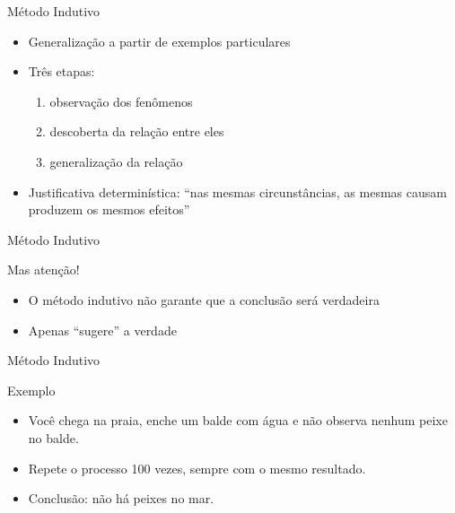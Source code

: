 \documentclass{beamer}
\begin{document}

\begin{frame}{Método Indutivo}
  \begin{itemize}
    \footnotesize
  \item \alert<1>{Generalização} a partir de exemplos particulares
    \bigskip
  \item Três etapas:
    \begin{enumerate}
      \scriptsize
    \item observação dos fenômenos
    \item descoberta da relação entre eles
    \item generalização da relação
    \end{enumerate}
    \bigskip
  \item Justificativa determinística: ``nas mesmas circunstâncias, as
    mesmas causam produzem os mesmos efeitos''
  \end{itemize}
\end{frame}


\begin{frame}{Método Indutivo}
  \begin{block}{Mas atenção!}
    \begin{itemize}
      \footnotesize
    \item O método indutivo não garante que a conclusão
      será verdadeira
      \bigskip
    \item Apenas ``sugere'' a verdade
    \end{itemize}
  \end{block}
\end{frame}

\begin{frame}{Método Indutivo}
  \begin{exampleblock}{Exemplo}
    \begin{itemize}
      \footnotesize
    \item Você chega na praia, enche um balde com água e não observa
      nenhum peixe no balde.
      \bigskip
    \item Repete o processo 100 vezes, sempre com o mesmo resultado.
      \bigskip
    \item Conclusão: não há peixes no mar.
    \end{itemize}
  \end{exampleblock}
\end{frame}
\end{document}
